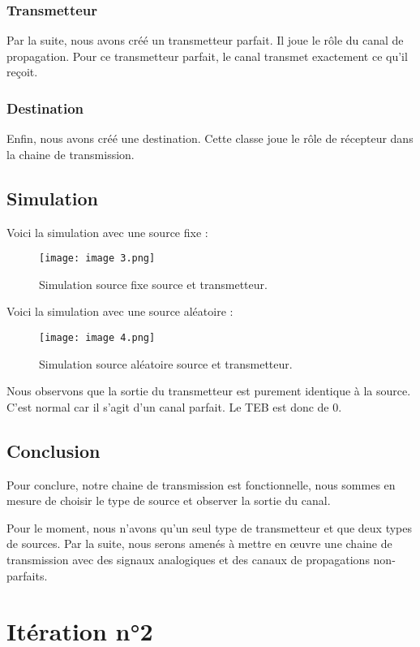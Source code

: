 \subsubsection{Transmetteur}

Par la suite, nous avons créé un transmetteur parfait. Il joue le rôle du canal de propagation. Pour ce transmetteur parfait, le canal transmet exactement ce qu’il reçoit.

\subsubsection{Destination}

Enfin, nous avons créé une destination. Cette classe joue le rôle de récepteur dans la chaine de transmission.

\subsection{Simulation}

Voici la simulation avec une source fixe :
\begin{figure}[h]
    \centering
    \texttt{[image: image 3.png]}
    \caption{\label{fig:image3}Simulation source fixe source et transmetteur.}
\end{figure}

Voici la simulation avec une source aléatoire :
\begin{figure}[h]
    \centering
    \texttt{[image: image 4.png]}
    \caption{\label{fig:image4}Simulation source aléatoire source et transmetteur.}
\end{figure}

Nous observons que la sortie du transmetteur est purement identique à la source. C’est normal car il s’agit d’un canal parfait. Le TEB est donc de 0.

\subsection{Conclusion}

Pour conclure, notre chaine de transmission est fonctionnelle, nous sommes en mesure de choisir le type de source et observer la sortie du canal.

Pour le moment, nous n’avons qu’un seul type de transmetteur et que deux types de sources. Par la suite, nous serons amenés à mettre en œuvre une chaine de transmission avec des signaux analogiques et des canaux de propagations non-parfaits.
\newpage
\section{Itération n°2}
